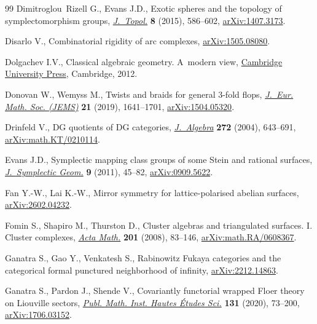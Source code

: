 \begin{thebibliography}{99}
Dimitroglou~Rizell G., Evans J.D., Exotic spheres and the topology of
 symplectomorphism groups,
 \href{https://doi.org/10.1112/jtopol/jtv007}{\textit{J.~Topol.}} \textbf{8}
 (2015), 586--602, \href{http://arxiv.org/abs/1407.3173}{arXiv:1407.3173}.

Disarlo V., Combinatorial rigidity of arc complexes,
 \href{http://arxiv.org/abs/1505.08080}{arXiv:1505.08080}.

Dolgachev I.V., Classical algebraic geometry. {A}~modern view,
 \href{https://doi.org/10.1017/CBO9781139084437}{Cambridge University Press},
 Cambridge, 2012.

Donovan W., Wemyss M., Twists and braids for general 3-fold flops,
 \href{https://doi.org/10.4171/JEMS/868}{\textit{J.~Eur. Math. Soc. (JEMS)}}
 \textbf{21} (2019), 1641--1701,
 \href{http://arxiv.org/abs/1504.05320}{arXiv:1504.05320}.

Drinfeld V., D{G} quotients of {DG} categories,
 \href{https://doi.org/10.1016/j.jalgebra.2003.05.001}{\textit{J.~Algebra}}
 \textbf{272} (2004), 643--691,
 \href{http://arxiv.org/abs/math.KT/0210114}{arXiv:math.KT/0210114}.

Evans J.D., Symplectic mapping class groups of some {S}tein and rational
 surfaces,
 \href{https://doi.org/10.4310/jsg.2011.v9.n1.a4}{\textit{J.~Symplectic
 Geom.}} \textbf{9} (2011), 45--82,
 \href{http://arxiv.org/abs/0909.5622}{arXiv:0909.5622}.

Fan Y.-W., Lai K.-W., Mirror symmetry for lattice-polarised abelian surfaces,
 \href{http://arxiv.org/abs/2602.04232}{arXiv:2602.04232}.

Fomin S., Shapiro M., Thurston D., Cluster algebras and triangulated surfaces.
 {I}. {C}luster complexes,
 \href{https://doi.org/10.1007/s11511-008-0030-7}{\textit{Acta Math.}}
 \textbf{201} (2008), 83--146,
 \href{http://arxiv.org/abs/math.RA/0608367}{arXiv:math.RA/0608367}.

Ganatra S., Gao Y., Venkatesh S., Rabinowitz {F}ukaya categories and the
 categorical formal punctured neighborhood of infinity,
 \href{http://arxiv.org/abs/2212.14863}{arXiv:2212.14863}.

Ganatra S., Pardon J., Shende V., Covariantly functorial wrapped {F}loer theory
 on {L}iouville sectors,
 \href{https://doi.org/10.1007/s10240-019-00112-x}{\textit{Publ. Math. Inst.
 Hautes \'{E}tudes Sci.}} \textbf{131} (2020), 73--200,
 \href{http://arxiv.org/abs/1706.03152}{arXiv:1706.03152}.


\end{thebibliography}
